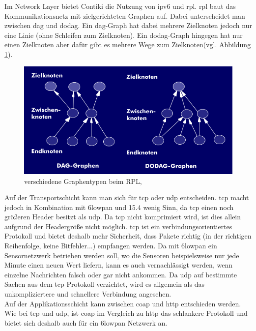 	Im Network Layer bietet Contiki die Nutzung von \ac{ipv6} und \ac{rpl}. \ac{rpl} baut das Kommunikationsnetz mit zielgerichteten Graphen auf. Dabei unterscheidet man zwischen \ac{dag} und \ac{dodag}. Ein \ac{dag}-Graph hat dabei mehrere Zielknoten jedoch nur eine Linie (ohne Schleifen zum Zielknoten). Ein \ac{dodag}-Graph hingegen hat nur einen Zielknoten aber dafür gibt es mehrere Wege zum Zielknoten(vgl. Abbildung \ref{RPL_DAG_DODAG}).\\
	\begin{figure}
		\centering
		\includegraphics[scale=0.5]{Grafiken-Julian/RPL_DAG_DODAG.png}
		\caption{verschiedene Graphentypen beim RPL, \cite{rpldagdodag}}
		\label{RPL_DAG_DODAG}
	\end{figure}
	Auf der Transportschicht kann man sich für \ac{tcp} oder \ac{udp} entscheiden. \ac{tcp} macht jedoch in Kombination mit \ac{6lowpan} und \ac{15.4} wenig Sinn, da \ac{tcp} einen noch größeren Header besitzt als \ac{udp}. Da \ac{tcp} nicht komprimiert wird, ist dies allein aufgrund der Headergröße nicht möglich. \ac{tcp} ist ein verbindungsorientiertes Protokoll und bietet deshalb mehr Sicherheit, dass Pakete richtig (in der richtigen Reihenfolge, keine Bitfehler...) empfangen werden. Da mit \ac{6lowpan} ein Sensornetzwerk betrieben werden soll, wo die Sensoren beispielsweise nur jede Minute einen neuen Wert liefern, kann es auch vernachlässigt werden, wenn einzelne Nachrichten falsch oder gar nicht ankommen. Da \ac{udp} auf bestimmte Sachen aus dem \ac{tcp} Protokoll verzichtet, wird es allgemein als das unkompliziertere und schnellere Verbindung angesehen.\\
	Auf der Applikationsschicht kann zwischen \ac{coap} und \ac{http} entschieden werden. Wie bei \ac{tcp} und \ac{udp}, ist \ac{coap} im Vergleich zu \ac{http} das schlankere Protokoll und bietet sich deshalb auch für ein \ac{6lowpan} Netzwerk an.\\
	
